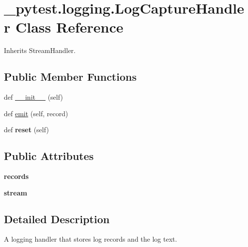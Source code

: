 \hypertarget{class__pytest_1_1logging_1_1_log_capture_handler}{}\section{\+\_\+pytest.\+logging.\+Log\+Capture\+Handler Class Reference}
\label{class__pytest_1_1logging_1_1_log_capture_handler}


Inherits Stream\+Handler.

\subsection*{Public Member Functions}
\begin{DoxyCompactItemize}
\item 
def \hyperlink{class__pytest_1_1logging_1_1_log_capture_handler_a1329c35c2ae164d5df28ee3a674e4e95}{\+\_\+\+\_\+init\+\_\+\+\_\+} (self)
\item 
def \hyperlink{class__pytest_1_1logging_1_1_log_capture_handler_a0997e513c8db86f1c105efdf822d217b}{emit} (self, record)
\item 
\mbox{\label{class__pytest_1_1logging_1_1_log_capture_handler_a94678bfe2f843da18c33f7bc8ea9151c}} 
def {\bfseries reset} (self)
\end{DoxyCompactItemize}
\subsection*{Public Attributes}
\begin{DoxyCompactItemize}
\item 
\mbox{\label{class__pytest_1_1logging_1_1_log_capture_handler_a467af34c860801367485fa8452d31811}} 
{\bfseries records}
\item 
\mbox{\label{class__pytest_1_1logging_1_1_log_capture_handler_ad731e780bf7f91c2a3aad2acf47d6891}} 
{\bfseries stream}
\end{DoxyCompactItemize}


\subsection{Detailed Description}
\begin{DoxyVerb}A logging handler that stores log records and the log text.\end{DoxyVerb}
 

